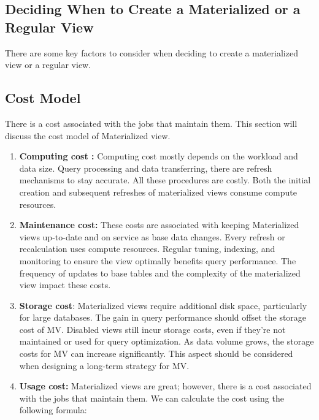 \subsection{Deciding When to Create a Materialized or a Regular View}There are some key factors to consider when deciding to create a materialized view or a regular view.




 \subsection{Cost Model}
There is a cost associated with the jobs that maintain them. This section will discuss the cost model of Materialized view.\vspace{.4cm}

 \begin{enumerate}[label=\alph*)]
    \item \textbf{Computing cost :} Computing cost mostly depends on the workload and data size. Query processing and data transferring, there are refresh mechanisms to stay accurate. All these procedures are costly. Both the initial creation and subsequent refreshes of materialized views consume compute resources.
    
    \item \textbf{Maintenance cost:} These costs are associated with keeping Materialized views up-to-date and on service as base data changes. Every refresh or recalculation uses compute resources. Regular tuning, indexing, and monitoring to ensure the view optimally benefits query performance. The frequency of updates to base tables and the complexity of the materialized view impact these costs. 
    
    \item \textbf{Storage cost}: Materialized views require additional disk space, particularly for large databases. The gain in query performance should offset the storage cost of MV. Disabled views still incur storage costs, even if they're not maintained or used for query optimization. As data volume grows, the storage costs for MV can increase significantly. This aspect should be considered when designing a long-term strategy for MV. 
     
    \item \textbf{Usage cost:} Materialized views are great; however, there is a cost associated with the jobs that maintain them. We can calculate the cost using the following formula: \cite{10.1145/2206869.2206874}


\end{enumerate}

